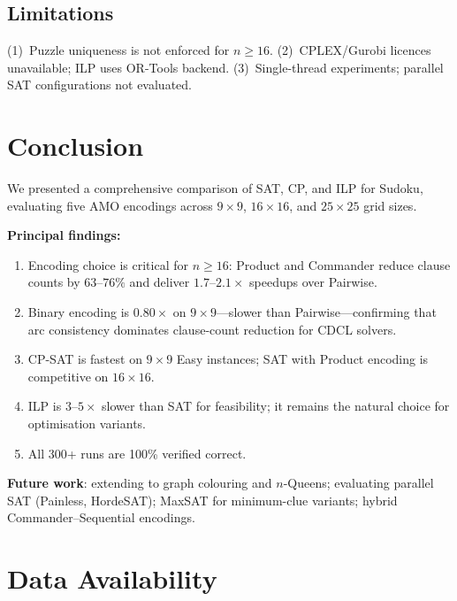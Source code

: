 \documentclass[preprint,10pt,authoryear]{elsarticle}
\begin{document}
\subsection{Limitations}

(1)~Puzzle uniqueness is not enforced for $n\geq 16$.
(2)~CPLEX/Gurobi licences unavailable; ILP uses OR-Tools backend.
(3)~Single-thread experiments; parallel SAT configurations not evaluated.

\section{Conclusion}
\label{sec:conclusion}

We presented a comprehensive comparison of SAT, CP, and ILP for Sudoku,
evaluating five AMO encodings across $9\!\times\!9$, $16\!\times\!16$, and
$25\!\times\!25$ grid sizes.

\noindent\textbf{Principal findings:}
\begin{enumerate}
  \item Encoding choice is critical for $n\geq 16$: Product and Commander
        reduce clause counts by $63$--$76\%$ and deliver $1.7$--$2.1\times$
        speedups over Pairwise.
  \item Binary encoding is $0.80\times$ on $9\times9$---slower than
        Pairwise---confirming that arc consistency dominates clause-count
        reduction for CDCL solvers.
  \item CP-SAT is fastest on $9\times9$ Easy instances; SAT with Product
        encoding is competitive on $16\times16$.
  \item ILP is $3$--$5\times$ slower than SAT for feasibility; it remains
        the natural choice for optimisation variants.
  \item All 300+ runs are 100\% verified correct.
\end{enumerate}

\noindent\textbf{Future work}: extending to graph colouring and $n$-Queens;
evaluating parallel SAT (Painless, HordeSAT); MaxSAT for minimum-clue
variants; hybrid Commander--Sequential encodings.


\section*{Data Availability}
\end{document}
